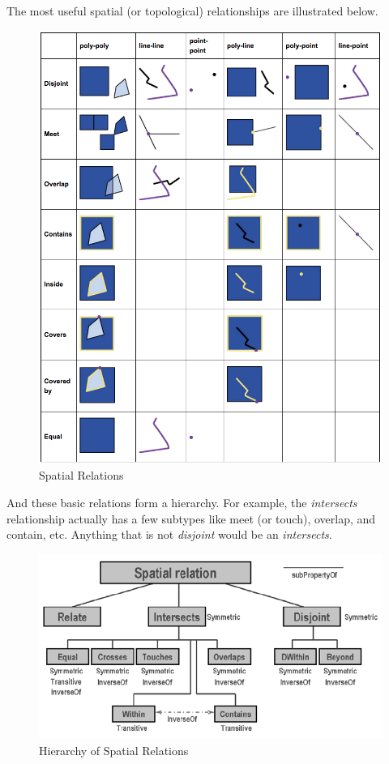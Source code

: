 \documentclass[
  11pt,
]{book}
\begin{document}
The most useful spatial (or topological) relationships are illustrated below.

\begin{figure}
\includegraphics[width=1\linewidth]{img/topo_relations} \caption{Spatial Relations}\label{fig:topo-relations}
\end{figure}

And these basic relations form a hierarchy. For example, the \emph{intersects} relationship actually has a few subtypes like meet (or touch), overlap, and contain, etc. Anything that is not \emph{disjoint} would be an \emph{intersects}.

\begin{figure}
\includegraphics[width=1\linewidth]{img/spatial_relations} \caption{Hierarchy of Spatial Relations}\label{fig:spatial-relations}
\end{figure}
\end{document}
